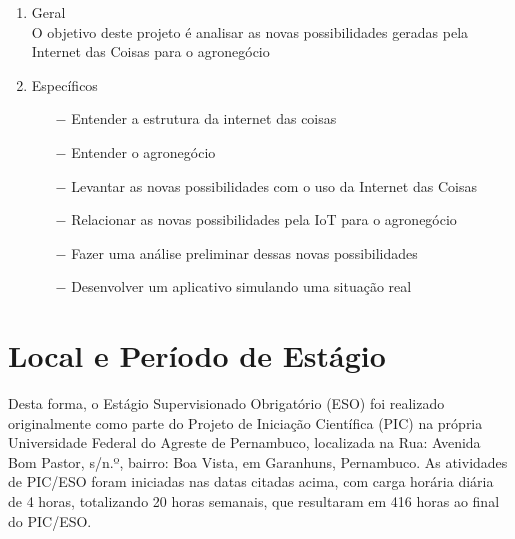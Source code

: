 \documentclass[eso]{bcc}
\begin{document}
\begin{enumerate}
    \item Geral\\
    O objetivo deste projeto é analisar as novas possibilidades geradas pela Internet das Coisas para o agronegócio
    \item Específicos
    \begin{enumerate}
        \item[$-$]  Entender a estrutura da internet das coisas
        \item[$-$] Entender o agronegócio
        \item[$-$] Levantar as novas possibilidades com o uso da Internet das Coisas
        \item[$-$] Relacionar as novas possibilidades pela IoT para o agronegócio 
        \item[$-$] Fazer uma análise preliminar dessas novas possibilidades
        \item[$-$] Desenvolver um aplicativo simulando uma situação real
    \end{enumerate}
\end{enumerate}





\chapter{Local e Período de Estágio}\label{chap:local}

\avisoPIC{}

Desta forma, o Estágio Supervisionado Obrigatório (ESO) foi realizado originalmente como parte do Projeto de 
Iniciação Científica (PIC) na própria Universidade Federal do Agreste de Pernambuco,
localizada na Rua: Avenida Bom Pastor, s/n.º, bairro: Boa Vista, em Garanhuns, Pernambuco.
As atividades de PIC/ESO foram iniciadas nas datas citadas acima, com carga horária diária 
de 4 horas, totalizando 20 horas semanais, que resultaram em 416 horas ao 
final do PIC/ESO\@.
\end{document}
